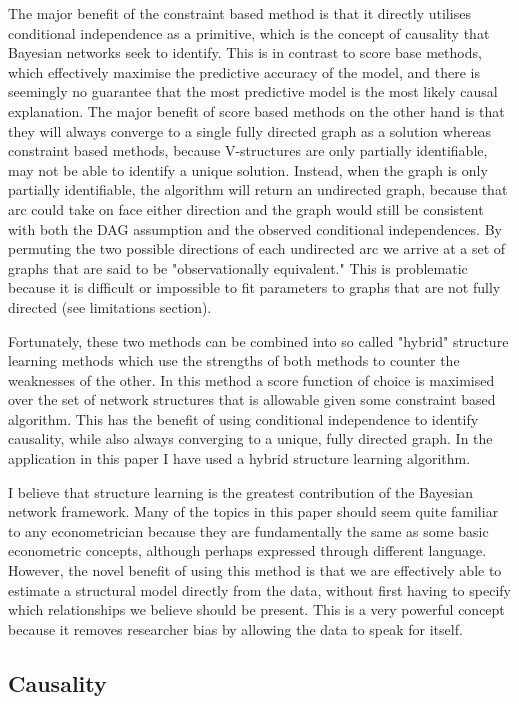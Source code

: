 \documentclass{article}
\begin{document}
The major benefit of the constraint based method is that it directly utilises conditional independence as a primitive, which is the concept of causality that Bayesian networks seek to identify. This is in contrast to score base methods, which effectively maximise the predictive accuracy of the model, and there is seemingly no guarantee that the most predictive model is the most likely causal explanation. The major benefit of score based methods on the other hand is that they will always converge to a single fully directed graph as a solution whereas constraint based methods, because V-structures are only partially identifiable, may not be able to identify a unique solution. Instead, when the graph is only partially identifiable, the algorithm will return an undirected graph, because that arc could take on face either direction and the graph would still be consistent with both the DAG assumption and the observed conditional independences. By permuting the two possible directions of each undirected arc we arrive at a set of graphs that are said to be "observationally equivalent." This is problematic because it is difficult or impossible to fit parameters to graphs that are not fully directed (see limitations section).  

Fortunately, these two methods can be combined into so called "hybrid" structure learning methods which use the strengths of both methods to counter the weaknesses of the other. In this method a score function of choice is maximised over the set of network structures that is allowable given some constraint based algorithm. This has the benefit of using conditional independence to identify causality, while also always converging to a unique, fully directed graph. In the application in this paper I have used a hybrid structure learning algorithm.

I believe that structure learning is the greatest contribution of the Bayesian network framework. Many of the topics in this paper should seem quite familiar to any econometrician because they are fundamentally the same as some basic econometric concepts, although perhaps expressed through different language. However, the novel benefit of using this method is that we are effectively able to estimate a structural model directly from the data, without first having to specify which relationships we believe should be present. This is a very powerful concept because it removes researcher bias by allowing the data to speak for itself.

\subsection{Causality}
\end{document}
